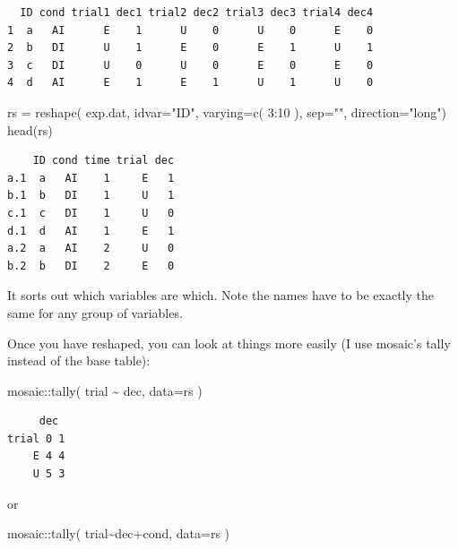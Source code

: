 \documentclass[
  letterpaper,
  DIV=11,
  numbers=noendperiod]{scrreprt}
\newenvironment{Shaded}{}{}
\newcommand{\AttributeTok}[1]{\textcolor[rgb]{0.49,0.56,0.16}{#1}}
\newcommand{\DecValTok}[1]{\textcolor[rgb]{0.25,0.63,0.44}{#1}}
\newcommand{\FunctionTok}[1]{\textcolor[rgb]{0.02,0.16,0.49}{#1}}
\newcommand{\NormalTok}[1]{#1}
\newcommand{\OtherTok}[1]{\textcolor[rgb]{0.00,0.44,0.13}{#1}}
\newcommand{\SpecialCharTok}[1]{\textcolor[rgb]{0.25,0.44,0.63}{#1}}
\newcommand{\StringTok}[1]{\textcolor[rgb]{0.25,0.44,0.63}{#1}}
\begin{document}
\begin{verbatim}
  ID cond trial1 dec1 trial2 dec2 trial3 dec3 trial4 dec4
1  a   AI      E    1      U    0      U    0      E    0
2  b   DI      U    1      E    0      E    1      U    1
3  c   DI      U    0      U    0      E    0      E    0
4  d   AI      E    1      E    1      U    1      U    0
\end{verbatim}

\begin{Shaded}
\begin{Highlighting}[]
\NormalTok{rs }\OtherTok{=} \FunctionTok{reshape}\NormalTok{( exp.dat,  }\AttributeTok{idvar=}\StringTok{"ID"}\NormalTok{, }
        \AttributeTok{varying=}\FunctionTok{c}\NormalTok{( }\DecValTok{3}\SpecialCharTok{:}\DecValTok{10}\NormalTok{ ), }\AttributeTok{sep=}\StringTok{""}\NormalTok{, }\AttributeTok{direction=}\StringTok{"long"}\NormalTok{)            }
\FunctionTok{head}\NormalTok{(rs)}
\end{Highlighting}
\end{Shaded}

\begin{verbatim}
    ID cond time trial dec
a.1  a   AI    1     E   1
b.1  b   DI    1     U   1
c.1  c   DI    1     U   0
d.1  d   AI    1     E   1
a.2  a   AI    2     U   0
b.2  b   DI    2     E   0
\end{verbatim}

It sorts out which variables are which. Note the names have to be
exactly the same for any group of variables.

Once you have reshaped, you can look at things more easily (I use
mosaic's tally instead of the base table):

\begin{Shaded}
\begin{Highlighting}[]
\NormalTok{mosaic}\SpecialCharTok{::}\FunctionTok{tally}\NormalTok{( trial }\SpecialCharTok{\textasciitilde{}}\NormalTok{ dec, }\AttributeTok{data=}\NormalTok{rs )}
\end{Highlighting}
\end{Shaded}

\begin{verbatim}
     dec
trial 0 1
    E 4 4
    U 5 3
\end{verbatim}

or

\begin{Shaded}
\begin{Highlighting}[]
\NormalTok{mosaic}\SpecialCharTok{::}\FunctionTok{tally}\NormalTok{( trial}\SpecialCharTok{\textasciitilde{}}\NormalTok{dec}\SpecialCharTok{+}\NormalTok{cond, }\AttributeTok{data=}\NormalTok{rs )}
\end{Highlighting}
\end{Shaded}
\end{document}
